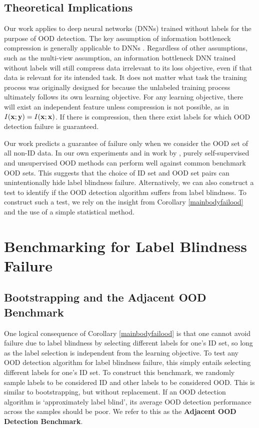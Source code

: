 \subsection{Theoretical Implications}

Our work applies to deep neural networks (DNNs) trained without labels for the purpose of OOD detection. The key assumption of information bottleneck compression is generally applicable to DNNs \citep{shwartz2017opening}. Regardless of other assumptions, such as the multi-view assumption, an information bottleneck DNN trained without labels will still compress data irrelevant to its loss objective, even if that data is relevant for its intended task. It does not matter what task the training process was originally designed for because the unlabeled training process ultimately follows its own learning objective. For any learning objective, there will exist an independent feature unless compression is not possible, as in $I({\mathbf{x}};{\mathbf{y}}) = I({\mathbf{x}};{\mathbf{x}})$. If there is compression, then there exist labels for which OOD detection failure is guaranteed.

Our work predicts a guarantee of failure only when we consider the OOD set of all non-ID data. In our own experiments and in work by \citet{sehwag2021ssd, hendrycks2019using, liu2023unsupervised}, purely self-supervised and unsupervised OOD methods can perform well against common benchmark OOD sets. This suggests that the choice of ID set and OOD set pairs can unintentionally hide label blindness failure. Alternatively, we can also construct a test to identify if the OOD detection algorithm suffers from label blindness. To construct such a test, we rely on the insight from Corollary \ref{mainbodyfailood} and the use of a simple statistical method.

\section{Benchmarking for Label Blindness Failure}

\subsection{Bootstrapping and the Adjacent OOD Benchmark}

One logical consequence of Corollary \ref{mainbodyfailood} is that one cannot avoid failure due to label blindness by selecting different labels for one's ID set, so long as the label selection is independent from the learning objective. To test any OOD detection algorithm for label blindness failure, this simply entails selecting different labels for one's ID set. To construct this benchmark, we randomly sample labels to be considered ID and other labels to be considered OOD. This is similar to bootstrapping, but without replacement. If an OOD detection algorithm is `approximately label blind', its average OOD detection performance across the samples should be poor. We refer to this as the \textbf{Adjacent OOD Detection Benchmark}.

